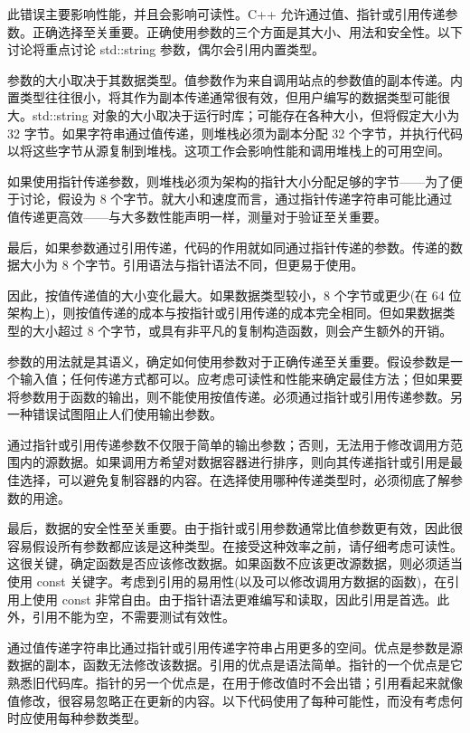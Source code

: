 此错误主要影响性能，并且会影响可读性。C++ 允许通过值、指针或引用传递参数。正确选择至关重要。正确使用参数的三个方面是其大小、用法和安全性。以下讨论将重点讨论 std::string 参数，偶尔会引用内置类型。

参数的大小取决于其数据类型。值参数作为来自调用站点的参数值的副本传递。内置类型往往很小，将其作为副本传递通常很有效，但用户编写的数据类型可能很大。std::string 对象的大小取决于运行时库；可能存在各种大小，但将假定大小为 32 字节。如果字符串通过值传递，则堆栈必须为副本分配 32 个字节，并执行代码以将这些字节从源复制到堆栈。这项工作会影响性能和调用堆栈上的可用空间。

如果使用指针传递参数，则堆栈必须为架构的指针大小分配足够的字节——为了便于讨论，假设为 8 个字节。就大小和速度而言，通过指针传递字符串可能比通过值传递更高效——与大多数性能声明一样，测量对于验证至关重要。

最后，如果参数通过引用传递，代码的作用就如同通过指针传递的参数。传递的数据大小为 8 个字节。引用语法与指针语法不同，但更易于使用。

因此，按值传递值的大小变化最大。如果数据类型较小，8 个字节或更少(在 64 位架构上)，则按值传递的成本与按指针或引用传递的成本完全相同。但如果数据类型的大小超过 8 个字节，或具有非平凡的复制构造函数，则会产生额外的开销。

参数的用法就是其语义，确定如何使用参数对于正确传递至关重要。假设参数是一个输入值；任何传递方式都可以。应考虑可读性和性能来确定最佳方法；但如果要将参数用于函数的输出，则不能使用按值传递。必须通过指针或引用传递参数。另一种错误试图阻止人们使用输出参数。

通过指针或引用传递参数不仅限于简单的输出参数；否则，无法用于修改调用方范围内的源数据。如果调用方希望对数据容器进行排序，则向其传递指针或引用是最佳选择，可以避免复制容器的内容。在选择使用哪种传递类型时，必须彻底了解参数的用途。

最后，数据的安全性至关重要。由于指针或引用参数通常比值参数更有效，因此很容易假设所有参数都应该是这种类型。在接受这种效率之前，请仔细考虑可读性。这很关键，确定函数是否应该修改数据。如果函数不应该更改源数据，则必须适当使用 const 关键字。考虑到引用的易用性(以及可以修改调用方数据的函数)，在引用上使用 const 非常自由。由于指针语法更难编写和读取，因此引用是首选。此外，引用不能为空，不需要测试有效性。


通过值传递字符串比通过指针或引用传递字符串占用更多的空间。优点是参数是源数据的副本，函数无法修改该数据。引用的优点是语法简单。指针的一个优点是它熟悉旧代码库。指针的另一个优点是，在用于修改值时不会出错；引用看起来就像值修改，很容易忽略正在更新的内容。以下代码使用了每种可能性，而没有考虑何时应使用每种参数类型。


